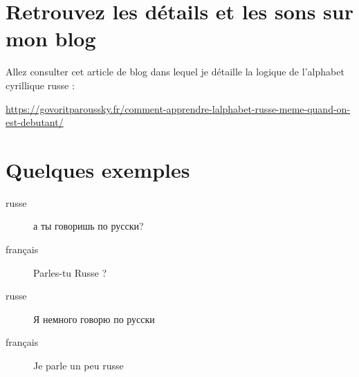 \documentclass[12pt,a4paper]{article}
\begin{document}
\section{Retrouvez les détails et les sons sur mon blog}
{\Large Allez consulter cet article de blog dans lequel je détaille la logique de l'alphabet cyrillique russe :\par}
\begin{center}
\url{https://govoritparoussky.fr/comment-apprendre-lalphabet-russe-meme-quand-on-est-debutant/}
\end{center}
\section{Quelques exemples}
\begin{description}
\item[russe]\textrussian{а ты говоришь по русски?}
\item[français]Parles-tu Russe ?
\item[russe]\textrussian{Я немного говорю по русски}
\item[français] Je parle un peu russe
\end{description}
\end{document}
